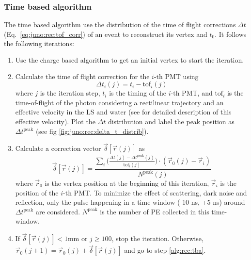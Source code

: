 \documentclass[../main.tex]{subfiles}
\begin{document}
\subsubsection{Time based algorithm}

The time based algorithm use the distribution of the time of flight corrections $\Delta t$ (Eq.\ \ref{eq:juno:rec:tof_corr}) of an event to reconstruct its vertex and $t_0$. It follows the following iterations:

\begin{enumerate}
  \item Use the charge based algorithm to get an initial vertex to start the iteration.

  \item \label{alg:rec:tba} Calculate the time of flight correction for the $i$-th PMT using \begin{equation}
      \label{eq:juno:rec:tof_corr}
      \Delta t_i (j) = t_i - \mathrm{tof}_i (j)
    \end{equation}
    where $j$ is the iteration step, $t_i$ is the timing of the $i$-th PMT, and $\mathrm{tof}_i$ is the time-of-flight of the photon considering a rectilinear trajectory and an effective velocity in the LS and water (see \cite{li_event_2021} for detailed description of this effective velocity). Plot the $\Delta t$ distribution and label the peak position as $\Delta t^{\mathrm{peak}}$ (see fig \ref{fig:juno:rec:delta_t_distrib}).

  \item Calculate a correction vector $\vec{\delta} [\vec{r}(j)]$ as \begin{equation}
      \vec{\delta} [\vec{r}(j)] = \frac{\sum_i \bigg(\frac{\Delta t(j) - \Delta t^{\mathrm{peak}}(j)}{\mathrm{tof}_i(j)} \bigg) \cdot (\vec{r}_0(j) - \vec{r}_i)}{N^{\mathrm{peak}}(j)}
    \end{equation}
    where $\vec{r}_0$ is the vertex position at the beginning of this iteration, $\vec{r}_i$ is the position of the $i$-th PMT. To minimize the effect of scattering, dark noise and reflection, only the pulse happening in a time window (-10 ns, +5 ns) around $\Delta t^{\mathrm{peak}}$ are considered. $N^{\mathrm{peak}}$ is the number of PE collected in this time-window.

  \item If $\vec{\delta} [\vec{r}(j)] < 1 \mathrm{mm}$ or $j \geq 100$, stop the iteration. Otherwise, $\vec{r}_0 (j + 1) = \vec{r}_0 (j) + \vec{\delta} [\vec{r}(j)]$ and go to step \ref{alg:rec:tba}.
\end{enumerate}
\end{document}
